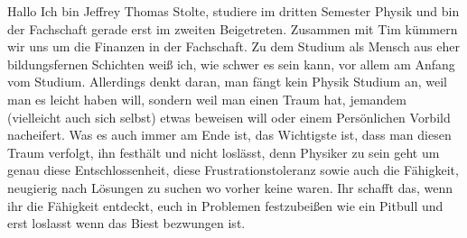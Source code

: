 \begin{multicols}{2}
{
Hallo Ich bin Jeffrey Thomas Stolte, studiere im dritten Semester Physik und bin der Fachschaft gerade erst im zweiten Beigetreten.
Zusammen mit Tim kümmern wir uns um die Finanzen in der Fachschaft. Zu dem Studium als Mensch aus eher bildungsfernen Schichten weiß ich, wie schwer es sein kann, vor allem am Anfang vom Studium. Allerdings denkt daran, man fängt kein Physik Studium an, weil man es leicht haben will, sondern weil man einen Traum hat, jemandem (vielleicht auch sich selbst) etwas beweisen will oder einem Persönlichen Vorbild nacheifert. Was es auch immer am Ende ist, das Wichtigste ist, dass man diesen Traum verfolgt, ihn festhält und nicht loslässt, denn Physiker zu sein geht um genau diese Entschlossenheit, diese Frustrationstoleranz sowie auch die Fähigkeit, neugierig nach Lösungen zu suchen wo vorher keine waren. Ihr schafft das, wenn ihr die Fähigkeit entdeckt, euch in Problemen festzubeißen wie ein Pitbull und erst loslasst wenn das Biest bezwungen ist.
}


\end{multicols}
